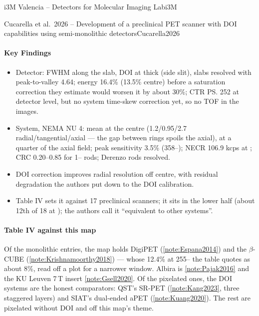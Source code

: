 \begin{programnote}{i3M Valencia -- Detectors for Molecular Imaging Lab}{i3M}
\begin{papernote}{Cucarella et al.\ 2026 -- Development of a preclinical PET scanner with DOI capabilities using semi-monolithic detectors}{Cucarella2026}
\paragraph{Key Findings}
\begin{itemize}
	\item Detector:  FWHM along the slab, DOI  at 
		thick (side slit), slabs resolved with peak-to-valley 4.64; energy
		16.4\% (13.5\% centre) before a saturation correction they estimate
		would worsen it by about 30\%; CTR \ps{252} at detector level, but no
		system time-skew correction yet, so no TOF in the images.
	\item System, NEMA NU 4:  mean at the centre (1.2/0.95/2.7
		radial/tangential/axial --- the gap between rings spoils the axial),
		 at a quarter of the axial field; peak sensitivity 3.5\%
		(358--); NECR 106.9 kcps at ; CRC 0.20--0.85 for
		1-- rods;  Derenzo rods resolved.
	\item DOI correction improves radial resolution off centre, with residual
		degradation the authors put down to the DOI calibration.
	\item Table IV sets it against 17 preclinical scanners; it sits in the
		lower half (about 12th of 18 at ); the authors call it
		``equivalent to other systems''.
\end{itemize}

\paragraph{Table IV against this map}
Of the monolithic entries, the map holds DigiPET (\ref{note:Espana2014}) and the
$\beta$-CUBE (\ref{note:Krishnamoorthy2018}) --- whose 12.4\% at
255-- the table quotes as about 8\%, read off a plot for a narrower
window. Albira is \ref{note:Pajak2016} and the KU Leuven 7\,T insert
\ref{note:Gsell2020}. Of the pixelated ones, the DOI systems are the honest
comparators: QST's SR-PET (\ref{note:Kang2023}, three staggered layers) and
SIAT's dual-ended aPET (\ref{note:Kuang2020}). The rest are pixelated without
DOI and off this map's theme.


\end{papernote}
\end{programnote}
